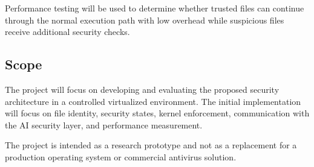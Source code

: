 Performance testing will be used to determine whether trusted files can continue through the normal execution path with low overhead while suspicious files receive additional security checks.

\subsection{Scope}

The project will focus on developing and evaluating the proposed security architecture in a controlled virtualized environment. The initial implementation will focus on file identity, security states, kernel enforcement, communication with the AI security layer, and performance measurement.

The project is intended as a research prototype and not as a replacement for a production operating system or commercial antivirus solution.
